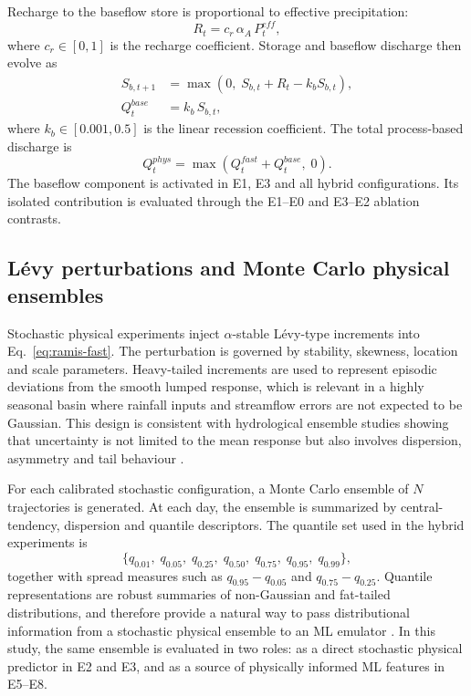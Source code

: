 \documentclass[a4paper,fleqn]{cas-sc}
\begin{document}
Recharge to the baseflow store is proportional to effective
precipitation:
\begin{equation}
R_t = c_r\,\alpha_A\,P^{eff}_t,
\label{eq:recharge}
\end{equation}
where $c_r\in[0,1]$ is the recharge coefficient. Storage and baseflow
discharge then evolve as
\begin{align}
S_{b,t+1} &= \max\!\left(0,\;S_{b,t} + R_t - k_b S_{b,t}\right),
\label{eq:storage}\\
Q^{base}_t &= k_b\,S_{b,t},
\label{eq:qbase}
\end{align}
where $k_b\in[0.001,0.5]$ is the linear recession coefficient. The
total process-based discharge is
\begin{equation}
Q^{phys}_t = \max\!\left(Q^{fast}_t + Q^{base}_t,\;0\right).
\label{eq:qtotal}
\end{equation}
The baseflow component is activated in E1, E3 and all hybrid
configurations. Its isolated contribution is evaluated through the
E1--E0 and E3--E2 ablation contrasts.

\subsection{L\'{e}vy perturbations and Monte Carlo physical ensembles}
\label{subsec:levy}

Stochastic physical experiments inject $\alpha$-stable L\'{e}vy-type
increments into Eq.~\ref{eq:ramis-fast}. The perturbation is governed
by stability, skewness, location and scale parameters. Heavy-tailed
increments are used to represent episodic deviations from the smooth
lumped response, which is relevant in a highly seasonal basin where
rainfall inputs and streamflow errors are not expected to be Gaussian.
This design is consistent with hydrological ensemble studies showing
that uncertainty is not limited to the mean response but also involves
dispersion, asymmetry and tail behaviour
\citep{hong2006uncertainty,gabellani2007propagation,abaza2017incidence}.

For each calibrated stochastic configuration, a Monte Carlo ensemble of
$N$ trajectories is generated. At each day, the ensemble is summarized
by central-tendency, dispersion and quantile descriptors. The quantile
set used in the hybrid experiments is
\begin{equation}
\{q_{0.01},\;q_{0.05},\;q_{0.25},\;q_{0.50},\;q_{0.75},
  \;q_{0.95},\;q_{0.99}\},
\label{eq:quantiles}
\end{equation}
together with spread measures such as $q_{0.95}-q_{0.05}$ and
$q_{0.75}-q_{0.25}$. Quantile representations are robust summaries of
non-Gaussian and fat-tailed distributions, and therefore provide a
natural way to pass distributional information from a stochastic
physical ensemble to an ML emulator \citep{swiderski2016aggregation}.
In this study, the same ensemble is evaluated in two roles: as a direct
stochastic physical predictor in E2 and E3, and as a source of
physically informed ML features in E5--E8.
\end{document}

